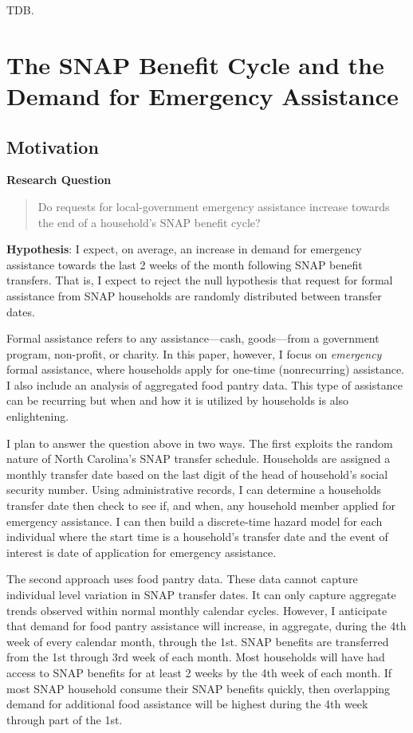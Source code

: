 \documentclass[12pt,letterpaperpaper,]{book}
\begin{document}
TDB.

\chapter{The SNAP Benefit Cycle and the Demand for Emergency
Assistance}\label{chapter-3}

\section*{Motivation}\label{motivation-2}

\textbf{Research Question}

\begin{quote}
Do requests for local-government emergency assistance increase towards
the end of a household's SNAP benefit cycle?
\end{quote}

\textbf{Hypothesis}: I expect, on average, an increase in demand for
emergency assistance towards the last 2 weeks of the month following
SNAP benefit transfers. That is, I expect to reject the null hypothesis
that request for formal assistance from SNAP households are randomly
distributed between transfer dates.

Formal assistance refers to any assistance---cash, goods---from a
government program, non-profit, or charity. In this paper, however, I
focus on \emph{emergency} formal assistance, where households apply for
one-time (nonrecurring) assistance. I also include an analysis of
aggregated food pantry data. This type of assistance can be recurring
but when and how it is utilized by households is also enlightening.

I plan to answer the question above in two ways. The first exploits the
random nature of North Carolina's SNAP transfer schedule. Households are
assigned a monthly transfer date based on the last digit of the head of
household's social security number. Using administrative records, I can
determine a households transfer date then check to see if, and when, any
household member applied for emergency assistance. I can then build a
discrete-time hazard model for each individual where the start time is a
household's transfer date and the event of interest is date of
application for emergency assistance.

The second approach uses food pantry data. These data cannot capture
individual level variation in SNAP transfer dates. It can only capture
aggregate trends observed within normal monthly calendar cycles.
However, I anticipate that demand for food pantry assistance will
increase, in aggregate, during the 4th week of every calendar month,
through the 1st. SNAP benefits are transferred from the 1st through 3rd
week of each month. Most households will have had access to SNAP
benefits for at least 2 weeks by the 4th week of each month. If most
SNAP household consume their SNAP benefits quickly, then overlapping
demand for additional food assistance will be highest during the 4th
week through part of the 1st.
\end{document}
